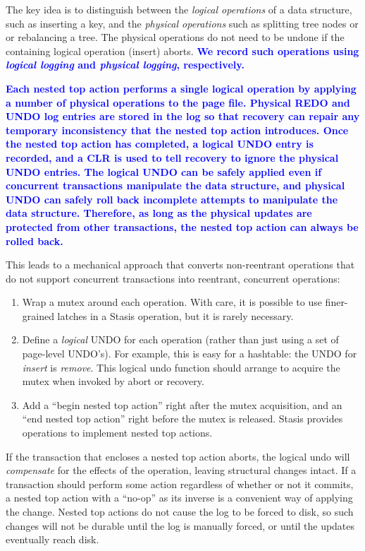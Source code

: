\documentclass[letterpaper,twocolumn,10pt]{article}
\newcommand{\yad}{Stasis\xspace}
\newcommand{\diff}[1]{\textcolor{blue}{\bf #1}}
\begin{document}
The key idea is to distinguish between the {\em logical operations} of a
data structure, such as inserting a key, and the {\em physical operations}
such as splitting tree nodes or or rebalancing a tree. The physical
operations do not need to be undone if the containing logical operation
(insert) aborts.  \diff{We record such operations using {\em logical 
logging} and {\em physical logging}, respectively.}

\diff{Each nested top action performs a single logical operation by
applying a number of physical operations to the page file.  Physical
REDO and UNDO log entries are stored in the log so that recovery can
repair any temporary inconsistency that the nested top action
introduces.  Once the nested top action has completed, a logical UNDO
entry is recorded, and a CLR is used to tell recovery to ignore the
physical UNDO entries.  The logical UNDO can be safely applied even if
concurrent transactions manipulate the data structure, and physical
UNDO can safely roll back incomplete attempts to manipulate the data
structure.  Therefore, as long as the physical updates are protected
from other transactions, the nested top action can always be rolled
back.}

This leads to a mechanical approach that converts non-reentrant
operations that do not support concurrent transactions into reentrant,
concurrent operations:

\begin{enumerate}
\item Wrap a mutex around each operation.  With care, it is possible 
  to use finer-grained latches in a \yad operation, but it is rarely necessary.
\item Define a {\em logical} UNDO for each operation (rather than just
  using a set of page-level UNDO's).  For example, this is easy for a
  hashtable: the UNDO for {\em insert} is {\em remove}.  This logical
  undo function should arrange to acquire the mutex when invoked by
  abort or recovery.
\item Add a ``begin nested
  top action'' right after the mutex acquisition, and an ``end
  nested top action'' right before the mutex is released.  \yad provides operations to implement nested top actions.
\end{enumerate}

If the transaction that encloses a nested top action aborts, the
logical undo will {\em compensate} for the effects of the operation,
leaving structural changes intact.  If a transaction should perform
some action regardless of whether or not it commits, a nested top
action with a ``no-op'' as its inverse is a convenient way of applying
the change.  Nested top actions do not cause the log to be forced to disk, so
such changes will not be durable until the log is manually forced, or
until the updates eventually reach disk.
\end{document}

